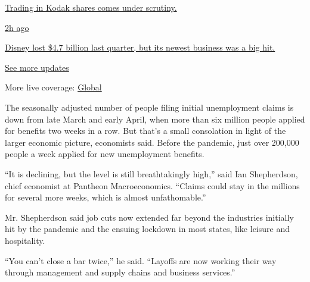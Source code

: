 \href{https://www.nytimes3xbfgragh.onion/live/2020/08/04/business/stock-market-today-coronavirus?action=click\&pgtype=Article\&state=default\&region=MAIN_CONTENT_1\&context=storylines_live_updates\#trading-in-kodak-shares-comes-under-scrutiny}{Trading
in Kodak shares comes under scrutiny.}

\href{https://www.nytimes3xbfgragh.onion/live/2020/08/04/business/stock-market-today-coronavirus?action=click\&pgtype=Article\&state=default\&region=MAIN_CONTENT_1\&context=storylines_live_updates\#disney-lost-4-7-billion-last-quarter-but-its-newest-business-was-a-big-hit}{2h
ago}

\href{https://www.nytimes3xbfgragh.onion/live/2020/08/04/business/stock-market-today-coronavirus?action=click\&pgtype=Article\&state=default\&region=MAIN_CONTENT_1\&context=storylines_live_updates\#disney-lost-4-7-billion-last-quarter-but-its-newest-business-was-a-big-hit}{Disney
lost \$4.7 billion last quarter, but its newest business was a big hit.}

\href{https://www.nytimes3xbfgragh.onion/live/2020/08/04/business/stock-market-today-coronavirus?action=click\&pgtype=Article\&state=default\&region=MAIN_CONTENT_1\&context=storylines_live_updates}{See
more updates}

More live coverage:
\href{https://www.nytimes3xbfgragh.onion/2020/08/04/world/coronavirus-cases.html?action=click\&pgtype=Article\&state=default\&region=MAIN_CONTENT_1\&context=storylines_live_updates}{Global}

The seasonally adjusted number of people filing initial unemployment
claims is down from late March and early April, when more than six
million people applied for benefits two weeks in a row. But that's a
small consolation in light of the larger economic picture, economists
said. Before the pandemic, just over 200,000 people a week applied for
new unemployment benefits.

``It is declining, but the level is still breathtakingly high,'' said
Ian Shepherdson, chief economist at Pantheon Macroeconomics. ``Claims
could stay in the millions for several more weeks, which is almost
unfathomable.''

Mr. Shepherdson said job cuts now extended far beyond the industries
initially hit by the pandemic and the ensuing lockdown in most states,
like leisure and hospitality.

``You can't close a bar twice,'' he said. ``Layoffs are now working
their way through management and supply chains and business services.''

